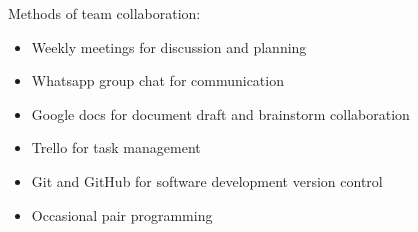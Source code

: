 Methods of team collaboration:
\begin{itemize}
\item Weekly meetings for discussion and planning
\item Whatsapp group chat for communication
\item Google docs for document draft and brainstorm collaboration
\item Trello for task management
\item Git and GitHub for software development version control
\item Occasional pair programming 
\end{itemize}